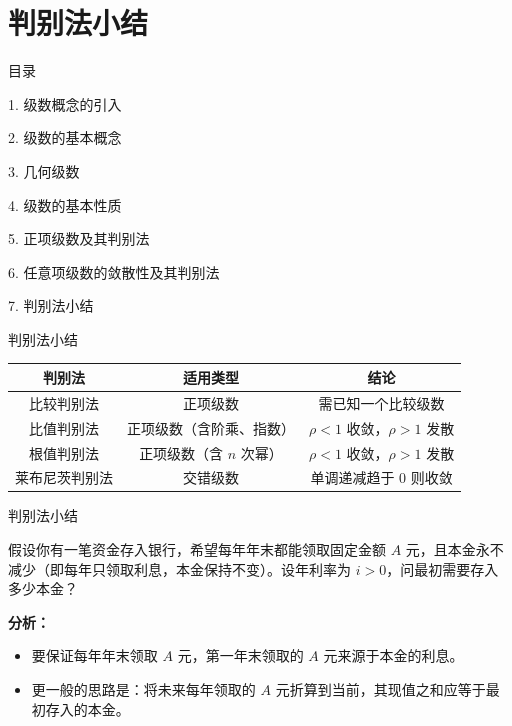 \documentclass[aspectratio=169,10pt,fontset=fandol]{ctexbeamer}
\begin{document}
\section{判别法小结}
\begin{frame}[t,fragile]{目录}
\normalsize
{\color{black}\normalsize 1. 级数概念的引入\par}\vspace{0.22em}
{\color{black}\normalsize 2. 级数的基本概念\par}\vspace{0.22em}
{\color{black}\normalsize 3. 几何级数\par}\vspace{0.22em}
{\color{black}\normalsize 4. 级数的基本性质\par}\vspace{0.22em}
{\color{black}\normalsize 5. 正项级数及其判别法\par}\vspace{0.22em}
{\color{black}\normalsize 6. 任意项级数的敛散性及其判别法\par}\vspace{0.22em}
{\color{blue}\normalsize 7. 判别法小结\par}\vspace{0.22em}
\end{frame}
\begin{frame}[t,fragile]{判别法小结}
\small
{\small
\begin{tabular}{|c|c|c|}
\hline
\textbf{判别法} & \textbf{适用类型} & \textbf{结论} \\
\hline
比较判别法 & 正项级数 & 需已知一个比较级数 \\
\hline
比值判别法 & 正项级数（含阶乘、指数） & \(\rho < 1\) 收敛，\(\rho > 1\) 发散 \\
\hline
根值判别法 & 正项级数（含 \(n\) 次幂） & \(\rho < 1\) 收敛，\(\rho > 1\) 发散 \\
\hline
莱布尼茨判别法 & 交错级数 & 单调递减趋于 0 则收敛 \\
\hline
\end{tabular}
}
\end{frame}
\begin{frame}[t,fragile]{判别法小结}
\normalsize
{\normalsize
\begin{application}

假设你有一笔资金存入银行，希望每年年末都能领取固定金额 \(A\) 元，且本金永不减少（即每年只领取利息，本金保持不变）。设年利率为 \(i>0\)，问最初需要存入多少本金？

\textbf{分析：}
\begin{itemize}
\item 要保证每年年末领取 \(A\) 元，第一年末领取的 \(A\) 元来源于本金的利息。
\item 更一般的思路是：将未来每年领取的 \(A\) 元折算到当前，其现值之和应等于最初存入的本金。

\end{itemize}\end{application}
}
\end{frame}
\end{document}
